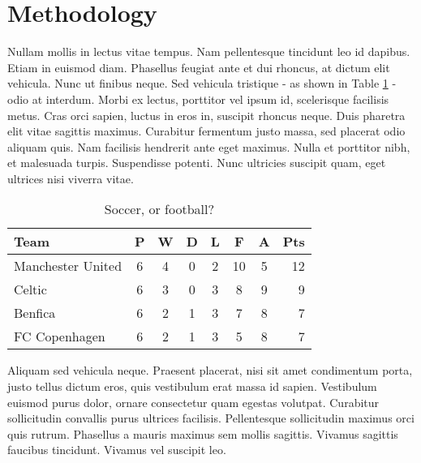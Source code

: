 \section{Methodology}

Nullam mollis in lectus vitae tempus. Nam pellentesque tincidunt leo id dapibus. Etiam in euismod diam. \cite{ceres-solver, Asaro:1976:POT} Phasellus feugiat ante et dui rhoncus, at dictum elit vehicula. Nunc ut finibus neque. Sed vehicula tristique - as shown in Table \ref{soccer} - odio at interdum. Morbi ex lectus, porttitor vel ipsum id, scelerisque facilisis metus. Cras orci sapien, luctus in eros in, suscipit rhoncus neque. Duis pharetra elit vitae sagittis maximus. Curabitur fermentum justo massa, sed placerat odio aliquam quis. Nam facilisis hendrerit ante eget maximus. Nulla et porttitor nibh, et malesuada turpis. Suspendisse potenti. Nunc ultricies suscipit quam, eget ultrices nisi viverra vitae.

\begin{table}[ht]
\begin{center}
    \caption{Soccer, or football?}
\label{soccer}
\begin{tabular}{l*{6}{c}r}
Team              & P & W & D & L & F  & A & Pts \\
\hline
Manchester United & 6 & 4 & 0 & 2 & 10 & 5 & 12  \\
Celtic            & 6 & 3 & 0 & 3 &  8 & 9 &  9  \\
Benfica           & 6 & 2 & 1 & 3 &  7 & 8 &  7  \\
FC Copenhagen     & 6 & 2 & 1 & 3 &  5 & 8 &  7  \\
\end{tabular}
\end{center}
\end{table}

Aliquam sed vehicula neque. Praesent placerat, nisi sit amet condimentum porta, justo tellus dictum eros, quis vestibulum erat massa id sapien. Vestibulum euismod purus dolor, ornare consectetur quam egestas volutpat. Curabitur sollicitudin convallis purus ultrices facilisis. Pellentesque sollicitudin maximus orci quis rutrum. Phasellus a mauris maximus sem mollis sagittis. Vivamus sagittis faucibus tincidunt. Vivamus vel suscipit leo.

